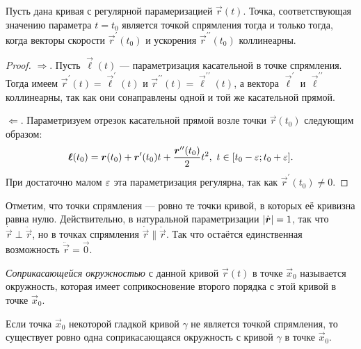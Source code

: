\begin{proposition} \label{proposition:Inflection}
	Пусть дана кривая с регулярной парамеризацией $\vec{r}(t)$. Точка, соответствующая значению параметра $t = t_0$ является точкой спрямления тогда и только тогда, когда векторы скорости $\vec{r}^\prime(t_0)$ и ускорения $\vec{r}^{\prime\prime}(t_0)$ коллинеарны.
\end{proposition}

\begin{proof}
	$\Rightarrow$. Пусть $\vec{\ell}(t)$ --- параметризация касательной в точке спрямления. Тогда имеем $\vec{r}^\prime(t) = \vec{\ell}^\prime(t)$ и $\vec{r}^{\prime\prime}(t) = \vec{\ell}^{\prime\prime}(t)$, а вектора $\vec{\ell}^\prime$ и $\vec{\ell}^{\prime\prime}$ коллинеарны, так как они сонаправлены одной и той же касательной прямой.

	$\Leftarrow$. Параметризуем отрезок касательной прямой возле точки $\vec{r}(t_0)$ следующим образом:
	\[
		\boldsymbol{\ell}(t_0) = \boldsymbol{r}(t_0) + \boldsymbol{r}^\prime(t_0)t + \frac{\boldsymbol{r}^{\prime\prime}(t_0)}{2}t^2,\ t \in [t_0 - \varepsilon; t_0 + \varepsilon].
	\]
	При достаточно малом $\varepsilon$ эта параметризация регулярна, так как $\vec{r}^{\prime}(t_0) \ne 0$.
\end{proof}

Отметим, что точки спрямления --- ровно те точки кривой, в которых её кривизна равна нулю. Действительно, в натуральной параметризации $\left\lvert\dot{\boldsymbol{r}}\right\rvert = 1$, так что $\dot{\vec{r}} \perp \ddot{\vec{r}}$, но в точках спрямления $\dot{\vec{r}} \parallel \ddot{\vec{r}}$. Так что остаётся единственная возможность $\ddot{\vec{r}} = \vec{0}$.

\begin{definition}
	\textit{Соприкасающейся окружностью} с данной кривой $\vec{r}(t)$ в точке $\vec{x}_0$ называется окружность, которая имеет соприкосновение второго порядка с этой кривой в точке $\vec{x}_0$.
\end{definition}

\begin{theorem} \label{theorem:TouchingCircle}
	Если точка $\vec{x}_0$ некоторой гладкой кривой $\gamma$ не является точкой спрямления, то существует ровно одна соприкасающаяся окружность с кривой $\gamma$ в точке $\vec{x}_0$.
\end{theorem}

